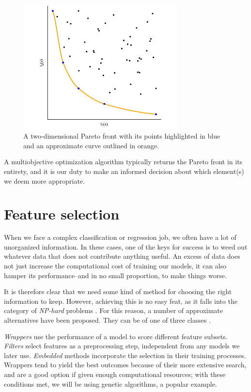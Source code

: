 	\begin{figure}[bth]

        \myfloatalign
        \includegraphics[width=0.75\textwidth]{gfx/ParetoFront.png}
        \caption{A two-dimensional Pareto front with its points highlighted in blue and an approximate curve outlined in orange.}

    \end{figure}

    A multiobjective optimization algorithm typically returns the Pareto front in its entirety, and it is our duty to make an informed decision about which element(s) we deem more appropriate.

\section{Feature selection}

	When we face a complex classification or regression job, we often have a lot of unorganized information. In these cases, one of the keys for success is to weed out whatever data that does not contribute anything useful. An excess of data does not just increase the computational cost of training our models, it can also hamper its performance--and in no small proportion, to make things worse.

	It is therefore clear that we need some kind of method for choosing the right information to keep. However, achieving this is no easy feat, as it falls into the category of \textit{NP-hard} problems \cite{amaldi1998approximability}. For this reason, a number of approximate alternatives have been proposed. They can be of one of three classes \cite{guyon2003introduction}.

	\textit{Wrappers} use the performance of a model to score different feature subsets. \textit{Filters} select features as a preprocessing step, independent from any models we later use. \textit{Embedded} methods incorporate the selection in their training processes. Wrappers tend to yield the best outcomes because of their more extensive search, and are a good option if given enough computational resources; with these conditions met, we will be using genetic algorithms, a popular example.

